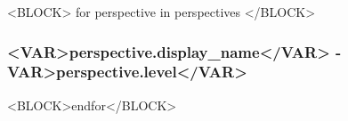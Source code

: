 <BLOCK> for perspective in perspectives </BLOCK>
\subsubsection*{<VAR>perspective.display_name</VAR> - \<VAR>perspective.level</VAR>}

<BLOCK>endfor</BLOCK>